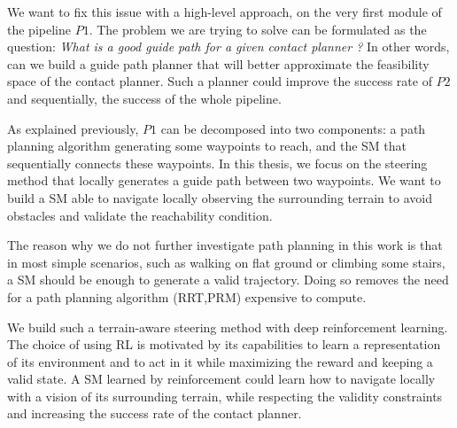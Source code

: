 We want to fix this issue with a high-level approach, on the very first module of the pipeline $P1$.
The problem we are trying to solve can be formulated as the question: \textit{What is a good guide path for a given contact planner ?} In other words, can we build a guide path planner that will better approximate the feasibility space of the contact planner. Such a planner could improve the success rate of $P2$ and sequentially, the success of the whole pipeline.

As explained previously, $P1$ can be decomposed into two components: a path planning algorithm generating some waypoints to reach, and the SM that sequentially connects these waypoints.
In this thesis, we focus on the steering method that locally generates a guide path between two waypoints.
We want to build a SM able to navigate locally observing the surrounding terrain to avoid obstacles and validate the reachability condition. 

The reason why we do not further investigate path planning in this work is that in most simple scenarios, such as walking on flat ground or climbing some stairs, a SM should be enough to generate a valid trajectory. Doing so removes the need for a path planning algorithm (RRT,PRM) expensive to compute.

We build such a terrain-aware steering method with deep reinforcement learning.
The choice of using RL is motivated by its capabilities to learn a representation of its environment and to act in it while maximizing the reward and keeping a valid state.
A SM learned by reinforcement could learn how to navigate locally with a vision of its surrounding terrain, while respecting the validity constraints and increasing the success rate of the contact planner.

